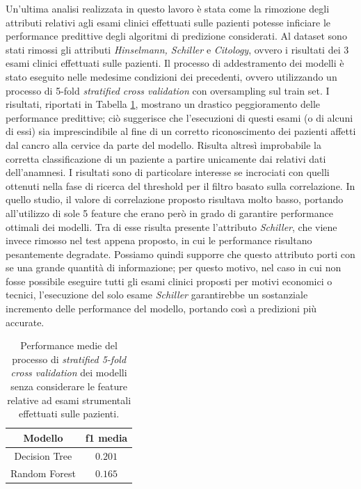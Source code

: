 Un'ultima analisi realizzata in questo lavoro è stata come la rimozione degli attributi relativi agli esami clinici effettuati sulle pazienti potesse inficiare le performance predittive degli algoritmi di predizione considerati. Al dataset sono stati rimossi gli attributi \textit{Hinselmann, Schiller} e \textit{Citology}, ovvero i risultati dei 3 esami clinici effettuati sulle pazienti. Il processo di addestramento dei modelli è stato eseguito nelle medesime condizioni dei precedenti, ovvero utilizzando un processo di 5-fold \textit{stratified cross validation} con oversampling sul train set. I risultati, riportati in Tabella \ref{tab:noexamsscore}, mostrano un drastico peggioramento delle performance predittive; ciò suggerisce che l'esecuzioni di questi esami (o di alcuni di essi) sia imprescindibile al fine di un corretto riconoscimento dei pazienti affetti dal cancro alla cervice da parte del modello. Risulta altresì improbabile la corretta classificazione di un paziente a partire unicamente dai relativi dati dell'anamnesi.
I risultati sono di particolare interesse se incrociati con quelli ottenuti nella fase di ricerca del threshold per il filtro basato sulla correlazione. In quello studio, il valore di correlazione proposto risultava molto basso, portando all'utilizzo di sole 5 feature che erano però in grado di garantire performance ottimali dei modelli. Tra di esse risulta presente l'attributo \textit{Schiller}, che viene invece rimosso nel test appena proposto, in cui le performance risultano pesantemente degradate. Possiamo quindi supporre che questo attributo porti con se una grande quantità di informazione; per questo motivo, nel caso in cui non fosse possibile eseguire tutti gli esami clinici proposti per motivi economici o tecnici, l'esecuzione del solo esame \textit{Schiller} garantirebbe un sostanziale incremento delle performance del modello, portando così a predizioni più accurate.
\begin{table}
	\centering
	\caption{Performance medie del processo di \textit{stratified 5-fold cross validation} dei modelli senza considerare le feature relative ad esami strumentali effettuati sulle pazienti.}
	\label{tab:noexamsscore}
	\begin{tabular}{|c|c|}
		\toprule
		Modello & f1 media \\ 
		\midrule 
		Decision Tree & $0.201$ \\  
		Random Forest  & $0.165$ \\ 
		\bottomrule
	\end{tabular}
\end{table}